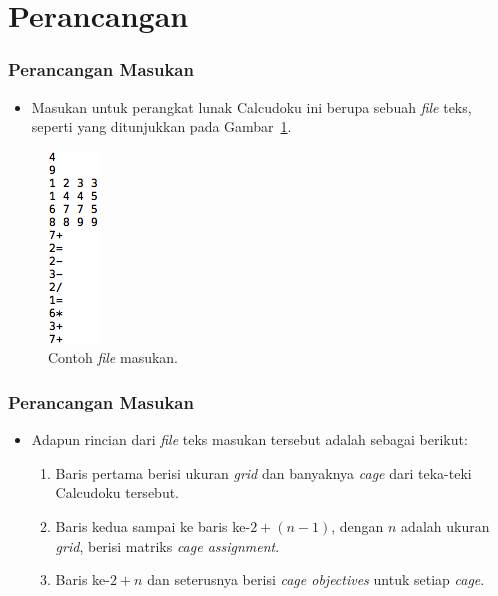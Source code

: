 \documentclass{beamer}
\begin{document}
\note{

}

\section{Perancangan}

\begin{frame}
\frametitle{Perancangan Masukan}
\begin{itemize}
\item Masukan untuk perangkat lunak Calcudoku ini berupa sebuah \textit{file} teks, seperti yang ditunjukkan pada Gambar~\ref{fig:perancanganmasukan}.
\end{itemize}
\begin{figure}
\centering
\captionsetup{justification=centering}
\includegraphics[scale=0.75]{Gambar/Perancangan/PerancanganInput.png}
\caption[Contoh \textit{file} masukan.]{Contoh \textit{file} masukan.}
\label{fig:perancanganmasukan}
\end{figure}
\end{frame}


\begin{frame}
\frametitle{Perancangan Masukan}
\begin{itemize}
\item Adapun rincian dari \textit{file} teks masukan tersebut adalah sebagai berikut:
	\begin{enumerate}
	\item Baris pertama berisi ukuran \textit{grid} dan banyaknya \textit{cage} dari teka-teki Calcudoku tersebut.
	\item Baris kedua sampai ke baris ke-\begin{math}2 + (n - 1)\end{math}, dengan \begin{math}n\end{math} adalah ukuran \textit{grid}, berisi matriks \textit{cage assignment}.
	\item Baris ke-\begin{math}2 + n\end{math} dan seterusnya berisi \textit{cage objectives} untuk setiap \textit{cage}.
	\end{enumerate}
\end{itemize}
\end{frame}
\end{document}
